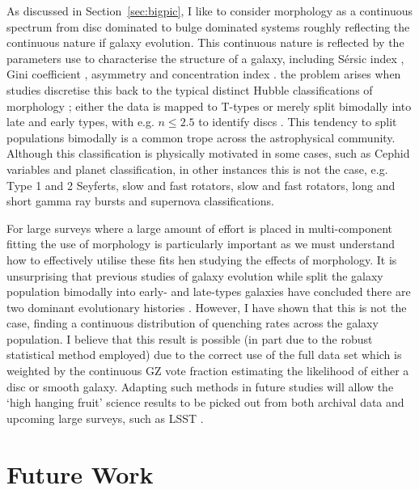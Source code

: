 As discussed in Section~\ref{sec:bigpic}, I like to consider morphology as a continuous spectrum from disc dominated to bulge dominated systems roughly reflecting the continuous nature if galaxy evolution. This continuous nature is reflected by the parameters use to characterise the structure of a galaxy, including S\'ersic index \citep{ref}, Gini coefficient \citep{ref}, asymmetry \citep{ref} and concentration index \citep{ref}. the problem arises when studies discretise this back to the typical distinct Hubble classifications of morphology \citep{citationbomb}; either the data is mapped to T-types \citep{refs} or merely split bimodally into late and early types, with e.g. $n \leq 2.5$ to identify discs \citep{refs}. This tendency to split populations bimodally is a common trope across the astrophysical community. Although this classification is physically motivated in some cases, such as Cephid variables and planet classification, in other instances this is not the case, e.g. Type 1 and 2 Seyferts, slow and fast rotators, slow and fast rotators, long and short gamma ray bursts and supernova classifications. 

For large surveys where a large amount of effort is placed in multi-component fitting \citep{refs} the use of morphology is particularly important as we must understand how to effectively utilise these fits hen studying the effects of morphology. It is unsurprising that previous studies of galaxy evolution while split the galaxy population bimodally into early- and late-types galaxies have concluded there are two dominant evolutionary histories \citep[e.g.][]{schawinski14}. However, I have shown that this is not the case, finding a continuous distribution of quenching rates across the galaxy population. I believe that this result is possible (in part due to the robust statistical method employed) due to the correct use of the full data set which is weighted by the continuous GZ vote fraction estimating the likelihood of either a disc or smooth galaxy. Adapting such methods in future studies will allow the `high hanging fruit' science results to be picked out from both archival data and upcoming large surveys, such as LSST \citep{}. 


\section{Future Work}\label{sec:future}

